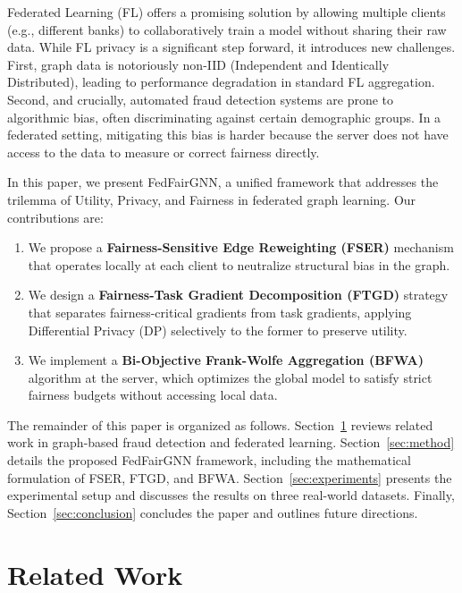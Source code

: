 \documentclass[pmlr]{jmlr}%
\begin{document}
Federated Learning (FL) offers a promising solution by allowing multiple clients (e.g., different banks) to collaboratively train a model without sharing their raw data. While FL privacy is a significant step forward, it introduces new challenges. First, graph data is notoriously non-IID (Independent and Identically Distributed), leading to performance degradation in standard FL aggregation. Second, and crucially, automated fraud detection systems are prone to algorithmic bias, often discriminating against certain demographic groups. In a federated setting, mitigating this bias is harder because the server does not have access to the data to measure or correct fairness directly.

In this paper, we present FedFairGNN, a unified framework that addresses the trilemma of Utility, Privacy, and Fairness in federated graph learning. Our contributions are:
\begin{enumerate}
  \item We propose a \textbf{Fairness-Sensitive Edge Reweighting (FSER)} mechanism that operates locally at each client to neutralize structural bias in the graph.
  \item We design a \textbf{Fairness-Task Gradient Decomposition (FTGD)} strategy that separates fairness-critical gradients from task gradients, applying Differential Privacy (DP) selectively to the former to preserve utility.
  \item We implement a \textbf{Bi-Objective Frank-Wolfe Aggregation (BFWA)} algorithm at the server, which optimizes the global model to satisfy strict fairness budgets without accessing local data.
\end{enumerate}

The remainder of this paper is organized as follows. Section~\ref{sec:related} reviews related work in graph-based fraud detection and federated learning. Section~\ref{sec:method} details the proposed FedFairGNN framework, including the mathematical formulation of FSER, FTGD, and BFWA. Section~\ref{sec:experiments} presents the experimental setup and discusses the results on three real-world datasets. Finally, Section~\ref{sec:conclusion} concludes the paper and outlines future directions.

\section{Related Work}
\label{sec:related}
\end{document}
